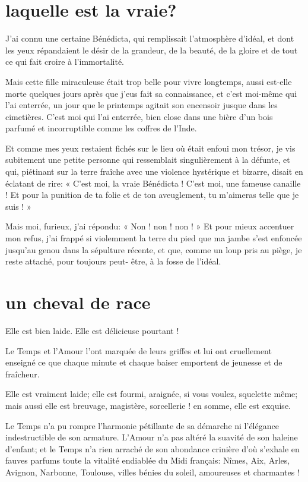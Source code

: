 \quebra\section[Laquelle est la vraie?]{laquelle est la vraie?}

J’ai connu une certaine Bénédicta, qui remplissait
l’atmosphère d’idéal, et dont les
yeux répandaient le désir de la grandeur, de la beauté, de la gloire et
de tout ce qui fait croire à l’immortalité.

Mais cette fille miraculeuse était trop belle pour vivre longtemps,
aussi est{}-elle morte quelques jours après que j’eus
fait sa connaissance, et c’est moi{}-même qui
l’ai enterrée, un jour que le printemps agitait son
encensoir jusque dans les cimetières. C’est moi qui
l’ai enterrée, bien close dans une bière
d’un bois parfumé et incorruptible comme les coffres
de l’Inde.

Et comme mes yeux restaient fichés sur le lieu où était enfoui mon
trésor, je vis subitement une petite personne qui ressemblait
singulièrement à la défunte, et qui, piétinant sur la terre fraîche
avec une violence hystérique et bizarre, disait en éclatant de rire:
« C’est moi, la vraie Bénédicta !
C’est moi, une fameuse canaille ! Et pour la punition
de ta folie et de ton aveuglement, tu m’aimeras telle
que je suis ! »

Mais moi, furieux, j’ai répondu: « Non ! non ! non ! »
Et pour mieux accentuer mon refus, j’ai frappé si
violemment la terre du pied que ma jambe s’est
enfoncée jusqu’au genou dans la sépulture récente, et
que, comme un loup pris au piège, je reste attaché, pour toujours
peut{}- être, à la fosse de l’idéal.

\quebra\section[Un cheval de race]{un cheval de race }

Elle est bien laide. Elle est délicieuse pourtant !

Le Temps et l’Amour l’ont marquée de
leurs griffes et lui ont cruellement enseigné ce que chaque minute et
chaque baiser emportent de jeunesse et de fraîcheur.

Elle est vraiment laide; elle est fourmi, araignée, si vous voulez,
squelette même; mais aussi elle est breuvage, magistère, sorcellerie !
en somme, elle est exquise.

Le Temps n’a pu rompre l’harmonie
pétillante de sa démarche ni l’élégance indestructible
de son armature. L’Amour n’a pas
altéré la suavité de son haleine d’enfant; et le Temps
n’a rien arraché de son abondance crinière
d’où s’exhale en fauves parfums toute
la vitalité endiablée du Midi français: Nîmes, Aix, Arles, Avignon,
Narbonne, Toulouse, villes bénies du soleil, amoureuses et charmantes !

